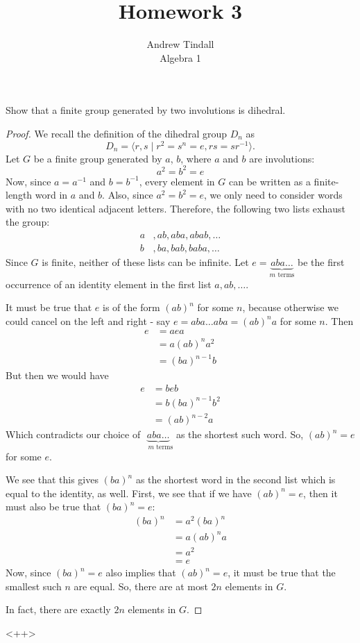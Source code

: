 \documentclass[12pt]{article}
\theoremstyle{definition}
\newenvironment{problem}[2][Problem]{\begin{trivlist}
\item[\hskip \labelsep {\bfseries #1}\hskip \labelsep {\bfseries #2.}]}{\end{trivlist}}
\begin{document}
 
 
\title{Homework 3}
\author{Andrew Tindall\\
Algebra 1}
 
\maketitle
\begin{problem}{1}
	Show that a finite group generated by two involutions is dihedral.
	\begin{proof}
		We recall the definition of the dihedral group $D_n$ as
		\[D_n = \langle r, s \mid r^2 = s^n = e, rs = sr^{-1}\rangle.\]
		Let $G$ be a finite group generated by $a$, $b$, where $a$ and $b$ are involutions: 
		\[a^2 = b^2 = e\]
		Now, since $a = a^{-1}$ and $b = b^{-1}$, every element in $G$ can be written as a finite-length word in $a$ and $b$. Also, since $a^2 = b^2 = e$, we only need to consider words with no two identical adjacent letters. Therefore, the following two lists exhaust the group:
		\begin{align*}
			a&, ab, aba, abab, \dots\\
			b&, ba, bab, baba, \dots
		\end{align*}
		Since $G$ is finite, neither of these lists can be infinite. Let $e = \underbrace{aba\dots}_{\text{$m$ terms}} $ be the first occurrence of an identity element in the first list $a, ab, \dots$.
		\par It must be true that $e$ is of the form $(ab)^n$ for some $n$, because otherwise we could cancel on the left and right - say $e = aba\dots aba = (ab)^na$ for some $n$. Then 
		\begin{align*}
			e &= aea\\
			&= a(ab)^n a^2\\
			&= (ba)^{n-1}b
		\end{align*}
		But then we would have 
		\begin{align*}
			e &= beb\\
			&= b(ba)^{n-1}b^2\\
			&= (ab)^{n-2}a
		\end{align*}
		Which contradicts our choice of $\underbrace{aba\dots}_{\text{ $m$ terms}}$ as the shortest such word. So, $(ab)^{n} = e$ for some $e$.
		\par We see that this gives $(ba)^{n}$ as the shortest word in the second list which is equal to the identity, as well. First, we see that if we have $(ab)^n = e$, then it must also be true that $(ba)^n = e$:
		\begin{align*}
			(ba)^n &= a^2 (ba)^n\\
			&= a(ab)^n a\\
			&= a^2\\
			&= e
		\end{align*}
		Now, since $(ba)^n = e$ also implies that $(ab)^n =e$, it must be true that the smallest such $n$ are equal. So, there are at most $2n$ elements in $G$.
		\par In fact, there are exactly $2n$ elements in $G$.
	\end{proof}<++>
\end{problem}
\end{document}
